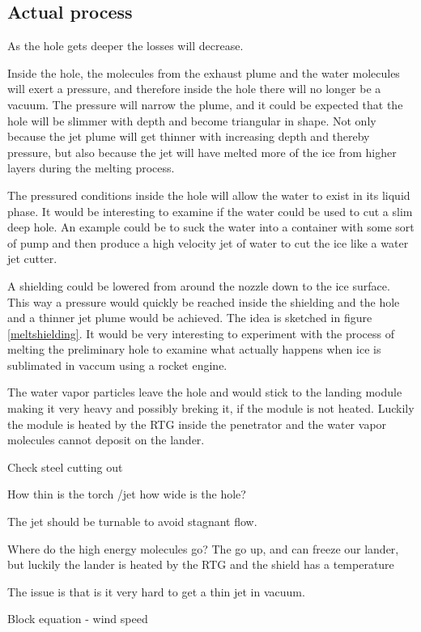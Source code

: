\subsection{Actual process}

As the hole gets deeper the losses will decrease. 

Inside the hole, the molecules from the exhaust plume and the water molecules will exert a pressure, and therefore inside the hole there will no longer be a vacuum. The pressure will narrow the plume, and it could be expected that the hole will be slimmer with depth and become triangular in shape. Not only because the jet plume will get thinner with increasing depth and thereby pressure, but also because the jet will have melted more of the ice from higher layers during the melting process. 

The pressured conditions inside the hole will allow the water to exist in its liquid phase. It would be interesting to examine if the water could be used to cut a slim deep hole. An example could be to suck the water into a container with some sort of pump and then produce a high velocity jet of water to cut the ice like a water jet cutter. 

A shielding could be lowered from around the nozzle down to the ice surface. This way a pressure would quickly be reached inside the shielding and the hole and a thinner jet plume would be achieved. The idea is sketched in figure \ref{meltshielding}.
It would be very interesting to experiment with the process of melting the preliminary hole to examine what actually happens when ice is sublimated in vaccum using a rocket engine. 


The water vapor particles leave the hole and would stick to the landing module making it very heavy and possibly breking it, if the module is not heated. Luckily the module is heated by the RTG inside the penetrator and the water vapor molecules cannot deposit on the lander. 

Check steel cutting out

How thin is the torch /jet how wide is the hole?


The jet should be turnable to avoid stagnant flow. 

Where do the high energy molecules go? The go up, and can freeze our lander, but luckily the lander is heated by the RTG and the shield has a temperature 

The issue is that is it very hard to get a thin jet in vacuum. 

Block equation - wind speed